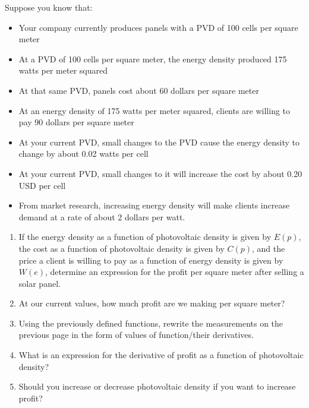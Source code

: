 \documentclass[12pt]{exam}
\begin{document}
\begin{enumerate}
  Suppose you know that:
    \begin{itemize}
      \item Your company currently produces panels with a PVD of 100 cells per square meter
      \item At a PVD of 100 cells per square meter, the energy density produced 175 watts per meter squared
      \item At that same PVD, panels cost about 60 dollars per square meter
      \item At an energy density of 175 watts per meter squared, clients are willing to pay 90 dollars per square meter
      \item At your current PVD, small changes to the PVD cause the energy density to change by about 0.02 watts per cell
      \item At your current PVD, small changes to it will increase the cost by about 0.20 USD per cell
      \item From market research, increasing energy density will make clients increase demand at a rate of about 2 dollars per watt.
    \end{itemize}

    \begin{enumerate}
      \item If the energy density as a function of photovoltaic density is given by $E(p)$, the cost as a function of photovoltaic density is given by $C(p)$, and the price a client is willing to pay as a function of energy density is given by $W(e)$, determine an expression
      for the profit per square meter after selling a solar panel.
      \vfill

      \item At our current values, how much profit are we making per square meter?
      \vfill
      \newpage

    \item Using the previously defined functions, rewrite the measurements on the previous page in the form of values of function/their derivatives.
      \vfill

    \item What is an expression for the derivative of profit as a function of photovoltaic density?
      \vfill

    \item Should you increase or decrease photovoltaic density if you want to increase profit?
      \vfill
    \end{enumerate}
\end{enumerate}


\end{document}
